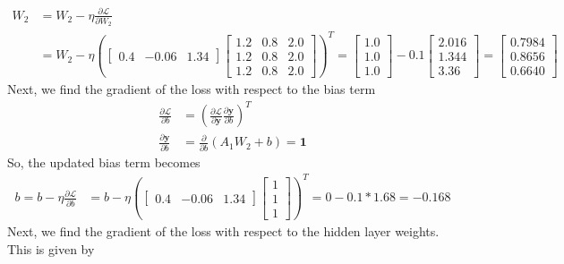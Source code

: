 \documentclass[12pt]{article}
\begin{document}
    \begin{align*}
        W_{2} &= W_{2} - \eta \frac{\partial \mathcal{L}}{\partial W_{2}} \\
        &= W_{2} - \eta \left( \begin{bmatrix}
            0.4 & -0.06 & 1.34
        \end{bmatrix} \begin{bmatrix}
            1.2 & 0.8 & 2.0 \\
            1.2 & 0.8 & 2.0 \\
            1.2 & 0.8 & 2.0
        \end{bmatrix} \right)^{T} = \begin{bmatrix}
            1.0 \\ 1.0 \\ 1.0
        \end{bmatrix} - 0.1 \begin{bmatrix}
            2.016 \\ 1.344 \\ 3.36
        \end{bmatrix} = \begin{bmatrix}
            0.7984 \\ 0.8656 \\ 0.6640
        \end{bmatrix}
    \end{align*}
    Next, we find the gradient of the loss with respect to the bias term
    \begin{align*}
        \frac{\partial \mathcal{L}}{\partial b} &= \left( \frac{\partial \mathcal{L}}{\partial \mathbf{y}}  \frac{\partial \mathbf{y}}{\partial b} \right)^{T} \\
        \frac{\partial \mathbf{y}}{\partial b} &= \frac{\partial}{\partial b} (A_{1} W_{2} + b) = \mathbf{1}
    \end{align*}
    So, the updated bias term becomes
    \begin{align*}
        b = b - \eta \frac{\partial \mathcal{L}}{\partial b} &= b - \eta \left( \begin{bmatrix}
            0.4 & -0.06 & 1.34
        \end{bmatrix} \begin{bmatrix}
            1 \\ 1 \\ 1
        \end{bmatrix} \right)^{T} = 0 - 0.1 * 1.68 = -0.168
    \end{align*}
    Next, we find the gradient of the loss with respect to the hidden layer weights. This is given by
\end{document}
